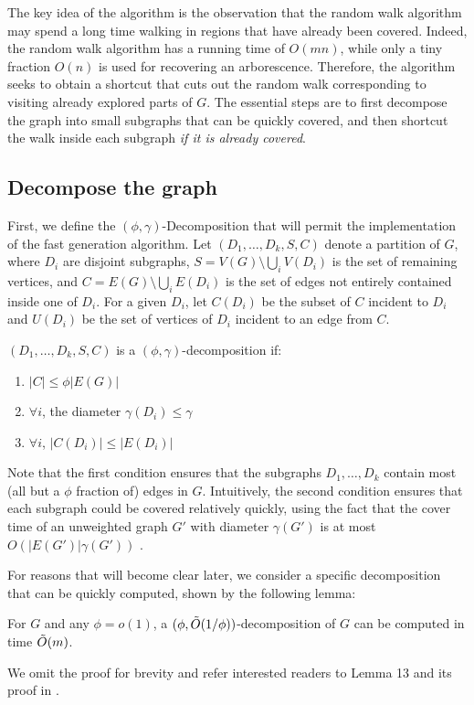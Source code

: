 The key idea of the algorithm is the observation that the random walk algorithm may spend a long time walking in regions that have already been covered. Indeed, the random walk algorithm has a running time of $O(mn)$, while only a tiny fraction $O(n)$ is used for recovering an arborescence.
Therefore, the algorithm seeks to obtain a shortcut that cuts out the random walk corresponding to visiting already explored parts of $G$.
The essential steps are to first decompose the graph into small subgraphs that can be quickly covered, and then shortcut the walk inside each subgraph \emph{if it is already covered}.

\subsection{Decompose the graph}
First, we define the $(\phi, \gamma)$-Decomposition that will permit the implementation of the fast generation algorithm. 
Let $(D_1, \dots, D_k, S, C)$ denote a partition of $G$, where $D_i$ are disjoint subgraphs, $S=V(G) \setminus \bigcup_i V(D_i)$ is the set of remaining vertices, and $C=E(G) \setminus \bigcup_i E(D_i)$ is the set of edges not entirely contained inside one of $D_i$. 
For a given $D_i$, let $C(D_i)$ be the subset of $C$ incident to $D_i$ and $U(D_i)$ be the set of vertices of $D_i$ incident to an edge from $C$.

\begin{definition}
   $(D_1, \dots, D_k, S, C)$ is a $(\phi, \gamma)$-decomposition if:
   \label{def:decomposition}
\begin{enumerate}
    \item $|C| \leq \phi |E(G)|$
    \item $\forall i$, the diameter $\gamma(D_i) \leq \gamma$
    \item $\forall i$, $|C(D_i)| \leq |E(D_i)|$
\end{enumerate}
\end{definition}
Note that the first condition ensures that the subgraphs $D_1, \dots, D_k$ contain most (all but a $\phi$ fraction of) edges in $G$.
Intuitively, the second condition ensures that each subgraph could be covered relatively quickly, using the fact that the cover time of an unweighted graph $G'$ with diameter $\gamma(G')$ is at most $O(|E(G')|\gamma(G'))$ \cite{aleliunas1979random}.

For reasons that will become clear later, we consider a specific decomposition that can be quickly computed, shown by the following lemma:
\begin{lemma}
\label{lem:decompose}
For $G$ and any $\phi=o(1)$, a $(\phi, \tilde{O}(1/\phi))$-decomposition of $G$ can be computed in time $\tilde{O}(m)$.
\end{lemma}
We omit the proof for brevity and refer interested readers to Lemma 13 and its proof in \cite{kelner2009faster}.

